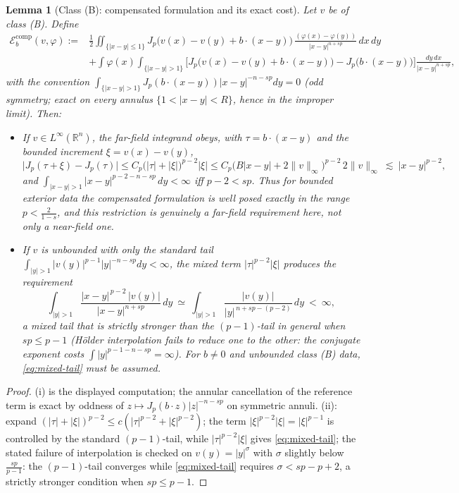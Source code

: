 \documentclass[11pt]{amsart}
\theoremstyle{plain}
\newtheorem{lemma}[theorem]{Lemma}
\theoremstyle{definition}
\theoremstyle{remark}
\newcommand{\R}{\mathbb{R}}
\begin{document}
\begin{lemma}[Class \textnormal{(B)}: compensated formulation and its exact
cost]\label{lem:classB}
Let $v$ be of class \textnormal{(B)}. Define
\begin{align*}
  \mathcal E_b^{\mathrm{comp}}(v,\varphi):={}&\frac12\iint_{\{|x-y|\le1\}}
    J_p\big(v(x)-v(y)+b\cdot(x-y)\big)\,
    \frac{(\varphi(x)-\varphi(y))}{|x-y|^{n+sp}}\,dx\,dy\\
  &+\int\varphi(x)\!\int_{\{|x-y|>1\}}
    \Big[J_p\big(v(x)-v(y)+b\cdot(x-y)\big)-J_p\big(b\cdot(x-y)\big)\Big]
    \frac{dy\,dx}{|x-y|^{n+sp}},
\end{align*}
with the convention
$\int_{\{|x-y|>1\}}J_p(b\cdot(x-y))|x-y|^{-n-sp}dy=0$
\textnormal{(}odd symmetry; exact on every annulus $\{1<|x-y|<R\}$, hence in
the improper limit\textnormal{)}. Then:
\begin{itemize}[leftmargin=2em]
\item[\textnormal{(i)}] If $v\in L^\infty(\R^n)$, the far-field integrand
obeys, with $\tau=b\cdot(x-y)$ and the \emph{bounded} increment
$\xi=v(x)-v(y)$,
\[
  \big|J_p(\tau+\xi)-J_p(\tau)\big|
  \le C_p\big(|\tau|+|\xi|\big)^{p-2}|\xi|
  \le C_p\big(B|x-y|+2\|v\|_\infty\big)^{p-2}\,2\|v\|_\infty
  \ \lesssim\ |x-y|^{p-2},
\]
and $\int_{|x-y|>1}|x-y|^{p-2-n-sp}\,dy<\infty$ \emph{iff} $p-2<sp$. Thus for
bounded exterior data the compensated formulation is well posed exactly in
the range $p<\frac2{1-s}$, and this restriction is genuinely a far-field
requirement here, not only a near-field one.
\item[\textnormal{(ii)}] If $v$ is unbounded with only the standard tail
$\int_{|y|>1}|v(y)|^{p-1}|y|^{-n-sp}dy<\infty$, the mixed term
$|\tau|^{p-2}|\xi|$ produces the requirement
\begin{equation}\label{eq:mixed-tail}
  \int_{|y|>1}\frac{|x-y|^{\,p-2}\,|v(y)|}{|x-y|^{n+sp}}\,dy
  \ \simeq\
  \int_{|y|>1}\frac{|v(y)|}{|y|^{\,n+sp-(p-2)}}\,dy\ <\ \infty,
\end{equation}
a \emph{mixed tail} that is strictly stronger than the $(p-1)$-tail in
general when $sp\le p-1$ \textnormal{(}H\"older interpolation fails to reduce
one to the other: the conjugate exponent costs
$\int|y|^{p-1-n-sp}=\infty$\textnormal{)}. For $b\neq0$ and unbounded class
\textnormal{(B)} data, \eqref{eq:mixed-tail} must be \emph{assumed}.
\end{itemize}
\end{lemma}
\begin{proof}
(i) is the displayed computation; the annular cancellation of the reference
term is exact by oddness of $z\mapsto J_p(b\cdot z)|z|^{-n-sp}$ on symmetric
annuli. (ii): expand $(|\tau|+|\xi|)^{p-2}\le
c(|\tau|^{p-2}+|\xi|^{p-2})$; the term $|\xi|^{p-2}|\xi|=|\xi|^{p-1}$ is
controlled by the standard $(p-1)$-tail, while $|\tau|^{p-2}|\xi|$ gives
\eqref{eq:mixed-tail}; the stated failure of interpolation is checked on
$v(y)=|y|^{\sigma}$ with $\sigma$ slightly below $\frac{sp}{p-1}$:
the $(p-1)$-tail converges while \eqref{eq:mixed-tail} requires
$\sigma<sp-p+2$, a strictly stronger condition when $sp\le p-1$.
\end{proof}
\end{document}
